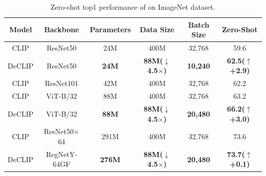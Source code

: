 \begin{table}[t]
\caption{\label{tab:zero-shot result} Zero-shot top1 performance of \workname on ImageNet dataset.  }
\label{sample-table}
\begin{center}
\begin{footnotesize}
\begin{sc}
\begin{tabular}{cccccc}
   \toprule  
   \textbf{Model}         & \textbf{Backbone} & \textbf{Parameters}  & \textbf{Data Size}   &\textbf{Batch Size}  & \textbf{Zero-Shot} \\
   \midrule   
   CLIP         &ResNet50 &24M &400M & 32,768 &59.6	\\
   DeCLIP       &ResNet50 & \textbf{24M} &\textbf{88M($\downarrow$ 4.5$\times$)}  & \textbf{10,240} &\textbf{62.5($\uparrow$  +2.9)} 	\\
      CLIP         &ResNet101 &42M &400M & 32,768 &62.2	\\

   \midrule
   CLIP         &ViT-B/32 &88M &400M & 32,768 &63.2	\\
   DeCLIP       &ViT-B/32 &\textbf{88M} &\textbf{88M($\downarrow$ 4.5$\times$)}   & \textbf{20,480} &\textbf{66.2($\uparrow$ +3.0)}	\\
  \midrule
  CLIP         &ResNet50$\times$64 &291M  &400M & 32,768 &73.6	\\
  DeCLIP       &RegNetY-64GF &\textbf{276M} &\textbf{88M($\downarrow$ 4.5$\times$)}   & \textbf{20,480} &\textbf{73.7($\uparrow$ +0.1)}	\\
  \bottomrule
\end{tabular}
\end{sc}
\end{footnotesize}
\end{center}
\end{table}



